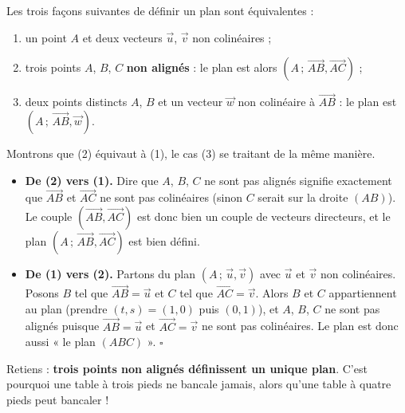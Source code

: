 \documentclass[11pt]{article}
\begin{document}
\begin{propriete}
Les trois façons suivantes de définir un plan sont équivalentes :
\begin{enumerate}
  \item un point $A$ et deux vecteurs $\vec{u}$, $\vec{v}$ non colinéaires ;
  \item trois points $A$, $B$, $C$ \textbf{non alignés} : le plan est alors $(A\,;\,\overrightarrow{AB},\overrightarrow{AC})$ ;
  \item deux points distincts $A$, $B$ et un vecteur $\vec{w}$ non colinéaire à $\overrightarrow{AB}$ : le plan est $(A\,;\,\overrightarrow{AB},\vec{w})$.
\end{enumerate}
\end{propriete}

\begin{experience}
Montrons que (2) équivaut à (1), le cas (3) se traitant de la même manière.
\begin{itemize}
  \item \textbf{De (2) vers (1).} Dire que $A$, $B$, $C$ ne sont pas alignés signifie exactement que $\overrightarrow{AB}$ et $\overrightarrow{AC}$ ne sont pas colinéaires (sinon $C$ serait sur la droite $(AB)$). Le couple $(\overrightarrow{AB},\overrightarrow{AC})$ est donc bien un couple de vecteurs directeurs, et le plan $(A\,;\,\overrightarrow{AB},\overrightarrow{AC})$ est bien défini.
  \item \textbf{De (1) vers (2).} Partons du plan $(A\,;\,\vec{u},\vec{v})$ avec $\vec{u}$ et $\vec{v}$ non colinéaires. Posons $B$ tel que $\overrightarrow{AB} = \vec{u}$ et $C$ tel que $\overrightarrow{AC} = \vec{v}$. Alors $B$ et $C$ appartiennent au plan (prendre $(t,s) = (1,0)$ puis $(0,1)$), et $A$, $B$, $C$ ne sont pas alignés puisque $\overrightarrow{AB} = \vec{u}$ et $\overrightarrow{AC} = \vec{v}$ ne sont pas colinéaires. Le plan est donc aussi « le plan $(ABC)$ ». \hfill $\square$
\end{itemize}
Retiens : \textbf{trois points non alignés définissent un unique plan}. C'est pourquoi une table à trois pieds ne bancale jamais, alors qu'une table à quatre pieds peut bancaler !
\end{experience}
\end{document}
